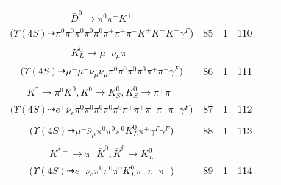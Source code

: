 \documentclass[landscape]{article}
\newcounter{rownumbers}
\newcommand\rn{\stepcounter{rownumbers}\arabic{rownumbers}}
\newcommand{\EOLP}{\\ \hline} %
\newcommand{\topoTags}[1]{#1} %
\begin{document}
\begin{longtable}{clcccc}
\rn & \makecell[l]{ $ 
\Upsilon(4S) \rightarrow B^{0} \bar{B}^{0} ,
B^{0} \rightarrow \pi^{0} \bar{D}^{0} ,
\bar{B}^{0} \rightarrow K^{-} D^{+} \bar{D}^{*0} ,
\bar{D}^{0} \rightarrow \pi^{0} \pi^{0} ,
D^{+} \rightarrow \pi^{+} \pi^{+} K^{-} \gamma^{F} ,
\bar{D}^{*0} \rightarrow \pi^{0} \bar{D}^{0} ,
$ \\ $
\bar{D}^{0} \rightarrow \pi^{0} \pi^{-} K^{+} 
$ \\ ($
\Upsilon(4S) \dashrightarrow \pi^{0} \pi^{0} \pi^{0} \pi^{0} \pi^{0} \pi^{+} \pi^{+} \pi^{-} K^{+} K^{-} K^{-} \gamma^{F} 
$) } & \topoTags{85 & }1 & 110 \EOLP

\rn & \makecell[l]{ $ 
\Upsilon(4S) \rightarrow B^{0} \bar{B}^{0} ,
B^{0} \rightarrow \pi^{0} \bar{D}^{0} ,
\bar{B}^{0} \rightarrow \mu^{-} \bar{\nu}_{\mu} D_{0}^{*+} \gamma^{F} ,
\bar{D}^{0} \rightarrow \pi^{0} \pi^{0} ,
D_{0}^{*+} \rightarrow \pi^{+} D^{0} ,
D^{0} \rightarrow \pi^{0} K_{L}^{0} ,
$ \\ $
K_{L}^{0} \rightarrow \mu^{-} \nu_{\mu} \pi^{+} 
$ \\ ($
\Upsilon(4S) \dashrightarrow \mu^{-} \mu^{-} \nu_{\mu} \bar{\nu}_{\mu} \pi^{0} \pi^{0} \pi^{0} \pi^{0} \pi^{+} \pi^{+} \gamma^{F} 
$) } & \topoTags{86 & }1 & 111 \EOLP

\rn & \makecell[l]{ $ 
\Upsilon(4S) \rightarrow B^{0} \bar{B}^{0} ,
B^{0} \rightarrow e^{+} \nu_{e} D^{*-} \gamma^{F} ,
\bar{B}^{0} \rightarrow \pi^{0} D^{0} ,
D^{*-} \rightarrow \pi^{-} \bar{D}^{0} ,
D^{0} \rightarrow \pi^{0} \pi^{0} ,
\bar{D}^{0} \rightarrow \pi^{0} \pi^{+} \pi^{-} K^{*} ,
$ \\ $
K^{*} \rightarrow \pi^{0} K^{0} ,
K^{0} \rightarrow K_{S}^{0} ,
K_{S}^{0} \rightarrow \pi^{+} \pi^{-} 
$ \\ ($
\Upsilon(4S) \dashrightarrow e^{+} \nu_{e} \pi^{0} \pi^{0} \pi^{0} \pi^{0} \pi^{0} \pi^{+} \pi^{+} \pi^{-} \pi^{-} \pi^{-} \gamma^{F} 
$) } & \topoTags{87 & }1 & 112 \EOLP

\rn & \makecell[l]{ $ 
\Upsilon(4S) \rightarrow \bar{B}^{0} \bar{B}^{0} ,
\bar{B}^{0} \rightarrow \pi^{0} D^{0} ,
\bar{B}^{0} \rightarrow \mu^{-} \bar{\nu}_{\mu} D^{+} \gamma^{F} ,
D^{0} \rightarrow \pi^{0} \pi^{0} ,
D^{+} \rightarrow K_{L}^{0} \pi^{+} \gamma^{F} 
$ \\ ($
\Upsilon(4S) \dashrightarrow \mu^{-} \bar{\nu}_{\mu} \pi^{0} \pi^{0} \pi^{0} K_{L}^{0} \pi^{+} \gamma^{F} \gamma^{F} 
$) } & \topoTags{88 & }1 & 113 \EOLP

\rn & \makecell[l]{ $ 
\Upsilon(4S) \rightarrow B^{0} \bar{B}^{0} ,
B^{0} \rightarrow e^{+} \nu_{e} D^{-} ,
\bar{B}^{0} \rightarrow \pi^{0} D^{0} ,
D^{-} \rightarrow K_{S}^{0} K^{*-} ,
D^{0} \rightarrow \pi^{0} \pi^{0} ,
K_{S}^{0} \rightarrow \pi^{+} \pi^{-} ,
$ \\ $
K^{*-} \rightarrow \pi^{-} \bar{K}^{0} ,
\bar{K}^{0} \rightarrow K_{L}^{0} 
$ \\ ($
\Upsilon(4S) \dashrightarrow e^{+} \nu_{e} \pi^{0} \pi^{0} \pi^{0} K_{L}^{0} \pi^{+} \pi^{-} \pi^{-} 
$) } & \topoTags{89 & }1 & 114 \EOLP


\end{longtable}
\end{document}
